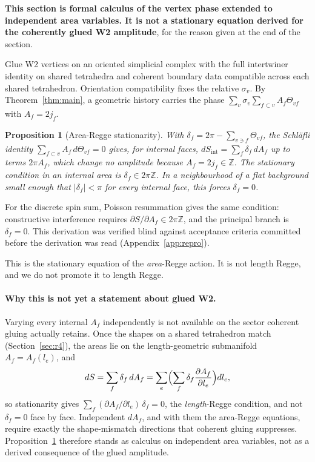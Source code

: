\documentclass[11pt]{article}
\numberwithin{equation}{section}
\newtheorem{proposition}[theorem]{Proposition}
\theoremstyle{definition}
\theoremstyle{remark}
\begin{document}
\textbf{This section is formal calculus of the vertex phase extended to
independent area variables. It is not a stationary equation derived for the
coherently glued W2 amplitude}, for the reason given at the end of the section.

Glue W2 vertices on an oriented simplicial complex with the full intertwiner
identity on shared tetrahedra and coherent boundary data compatible across each
shared tetrahedron. Orientation compatibility fixes the relative $\sigma_v$. By
Theorem~\ref{thm:main}, a geometric history carries the phase
$\sum_v\sigma_v\sum_{f\subset v}A_f\Theta_{vf}$ with $A_f=2j_f$.

\begin{proposition}[Area-Regge stationarity]\label{prop:r3}
With $\delta_f=2\pi-\sum_{v\ni f}\Theta_{vf}$, the Schläfli identity
$\sum_{f\subset v}A_f\,d\Theta_{vf}=0$ gives, for internal faces,
$dS_{\mathrm{int}}=\sum_f\delta_f\,dA_f$ up to terms $2\pi A_f$, which change no
amplitude because $A_f=2j_f\in\mathbb Z$. The stationary condition in an internal area
is $\delta_f\in2\pi\mathbb Z$. In a neighbourhood of a flat background small
enough that $|\delta_f|<\pi$ for every internal face, this forces $\delta_f=0$.
\end{proposition}

For the discrete spin sum, Poisson resummation gives the same condition:
constructive interference requires $\partial S/\partial A_f\in2\pi\mathbb Z$,
and the principal branch is $\delta_f=0$. This derivation was verified blind
against acceptance criteria committed before the derivation was read
(Appendix~\ref{app:repro}).

This is the stationary equation of the \emph{area}-Regge action. It is not length
Regge, and we do not promote it to length Regge.

\paragraph{Why this is not yet a statement about glued W2.}
Varying every internal $A_f$ independently is not available on the sector
coherent gluing actually retains. Once the shapes on a shared tetrahedron match
(Section~\ref{sec:r4}), the areas lie on the length-geometric submanifold
$A_f=A_f(l_e)$, and
\[
dS=\sum_f\delta_f\,dA_f
 =\sum_e\Bigl(\sum_f\delta_f\frac{\partial A_f}{\partial l_e}\Bigr)dl_e,
\]
so stationarity gives $\sum_f(\partial A_f/\partial l_e)\,\delta_f=0$, the
\emph{length}-Regge condition, and not $\delta_f=0$ face by face. Independent
$dA_f$, and with them the area-Regge equations, require exactly the
shape-mismatch directions that coherent gluing suppresses. Proposition~\ref{prop:r3}
therefore stands as calculus on independent area variables, not as a derived
consequence of the glued amplitude.
\end{document}

